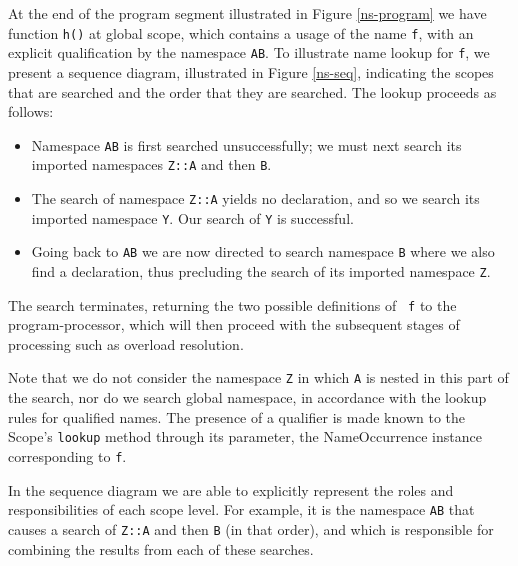 At the end of the program segment illustrated in Figure \ref{ns-program}
we have function {\tt h()} at global scope,
which contains a usage of the name {\tt f}, with an explicit
qualification by the namespace {\tt AB}.  To illustrate name lookup
for {\tt f}, we present a sequence diagram, illustrated in
Figure \ref{ns-seq}, indicating the
scopes that are searched and the order that they are
searched.  
The lookup proceeds as follows:

\begin{itemize}
\item Namespace {\tt AB} is first searched unsuccessfully; we must
next search its imported namespaces {\tt Z::A} and then {\tt B}.
\item The search of namespace {\tt Z::A} yields no declaration, and so
we search its imported namespace {\tt Y}.  Our search of {\tt Y} is
successful. 
\item Going back to {\tt AB} we are now directed to search namespace
{\tt B} where we also find a declaration, thus precluding the search
of its imported namespace {\tt Z}.
\end{itemize}

The search terminates, returning the two possible definitions of {\tt
f} to the program-processor, which will then proceed with the
subsequent stages of processing such as overload resolution.

Note that we do not consider the namespace {\tt Z} in which {\tt A} is
nested in this part of the search, nor do we search global namespace,
in accordance with the lookup rules for qualified names.  The presence
of a qualifier is made known to the {\sf Scope}'s {\tt lookup} method
through its parameter, the {\sf NameOccurrence} instance corresponding
to {\tt f}.

In the sequence diagram we are able to explicitly represent the roles
and responsibilities of each scope level.  For example, it is the
namespace {\tt AB} that causes a search of {\tt Z::A} and then {\tt B}
(in that order), and which is responsible for combining the results
from each of these searches.

